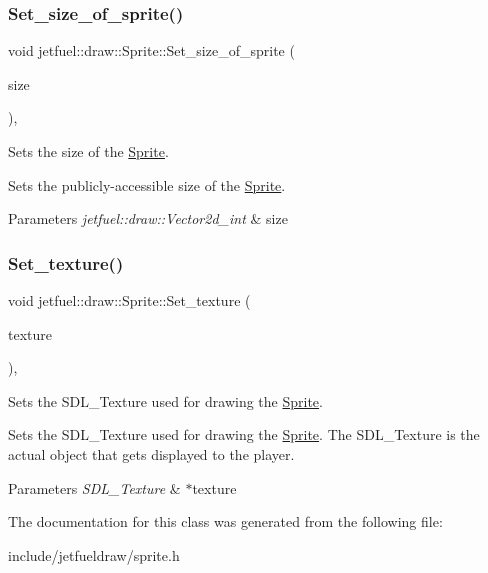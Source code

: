 \subsubsection{\texorpdfstring{Set\+\_\+size\+\_\+of\+\_\+sprite()}{Set\_size\_of\_sprite()}}
{\footnotesize\ttfamily void jetfuel\+::draw\+::\+Sprite\+::\+Set\+\_\+size\+\_\+of\+\_\+sprite (\begin{DoxyParamCaption}\item[{const \hyperlink{classjetfuel_1_1draw_1_1Vector2d}{Vector2d\+\_\+int}}]{size }\end{DoxyParamCaption})\hspace{0.3cm}{\ttfamily [inline]}, {\ttfamily [protected]}}



Sets the size of the \hyperlink{classjetfuel_1_1draw_1_1Sprite}{Sprite}. 

Sets the publicly-\/accessible size of the \hyperlink{classjetfuel_1_1draw_1_1Sprite}{Sprite}.


\begin{DoxyParams}{Parameters}
{\em jetfuel\+::draw\+::\+Vector2d\+\_\+int} & size \\
\hline
\end{DoxyParams}
\mbox{\label{classjetfuel_1_1draw_1_1Sprite_aa44e34d0f40435ad48d0bf2ccb5c25e0}} 
\subsubsection{\texorpdfstring{Set\+\_\+texture()}{Set\_texture()}}
{\footnotesize\ttfamily void jetfuel\+::draw\+::\+Sprite\+::\+Set\+\_\+texture (\begin{DoxyParamCaption}\item[{S\+D\+L\+\_\+\+Texture $\ast$}]{texture }\end{DoxyParamCaption})\hspace{0.3cm}{\ttfamily [inline]}, {\ttfamily [protected]}}



Sets the S\+D\+L\+\_\+\+Texture used for drawing the \hyperlink{classjetfuel_1_1draw_1_1Sprite}{Sprite}. 

Sets the S\+D\+L\+\_\+\+Texture used for drawing the \hyperlink{classjetfuel_1_1draw_1_1Sprite}{Sprite}. The S\+D\+L\+\_\+\+Texture is the actual object that gets displayed to the player.


\begin{DoxyParams}{Parameters}
{\em S\+D\+L\+\_\+\+Texture} & $\ast$texture \\
\hline
\end{DoxyParams}


The documentation for this class was generated from the following file\+:\begin{DoxyCompactItemize}
\item 
include/jetfueldraw/sprite.\+h\end{DoxyCompactItemize}
